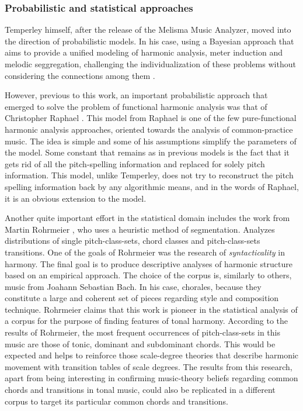     \subsubsection{Probabilistic and statistical approaches}
    Temperley himself, after the release of the Melisma Music Analyzer, moved into the direction of probabilistic models. In his case, using a Bayesian approach that aims to provide a unified modeling of harmonic analysis, meter induction and melodic seggregation, challenging the individualization of these problems without considering the connections among them \cite{temperley2009unified}.

    However, previous to this work, an important probabilistic approach that emerged to solve the problem of functional harmonic analysis was that of Christopher Raphael \cite{raphael2003harmonic}.
    This model from Raphael is one of the few pure-functional harmonic analysis approaches, oriented towards the analysis of common-practice music. The idea is simple and some of his assumptions simplify the parameters of the model. Some constant that remains as in previous models is the fact that it gets rid of all the pitch-spelling information and replaced for solely pitch information. This model, unlike Temperley, does not try to reconstruct the pitch spelling information back by any algorithmic means, and in the words of Raphael, it is an obvious extension to the model.

    Another quite important effort in the statistical domain includes the work from Martin Rohrmeier \cite{rohrmeier2008statistical}, who uses a heuristic method of segmentation. Analyzes distributions of single pitch-class-sets, chord classes and pitch-class-sets transitions. One of the goals of Rohrmeier was the research of \emph{syntacticality} in harmony. The final goal is to produce descriptive analyses of harmonic structure based on an empirical approach. The choice of the corpus is, similarly to others, music from Joahann Sebastian Bach. In his case, chorales, because they constitute a large and coherent set of pieces regarding style and composition technique. Rohrmeier claims that this work is pioneer in the statistical analysis of a corpus for the purpose of finding features of tonal harmony. According to the results of Rohrmeier, the most frequent occurrences of pitch-class-sets in this music are those of tonic, dominant and subdominant chords. This would be expected and helps to reinforce those scale-degree theories that describe harmonic movement with transition tables of scale degrees. The results from this research, apart from being interesting in confirming music-theory beliefs regarding common chords and transitions in tonal music, could also be replicated in a different corpus to target its particular common chords and transitions.

